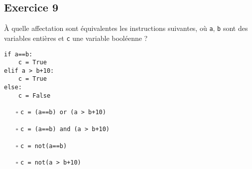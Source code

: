 \documentclass[11pt,a4paper]{article}
\providecommand{\tightlist}{\setlength{\itemsep}{0pt}\setlength{\parskip}{0pt}}
\begin{document}
 

\hypertarget{octicons-pencil-16-exercice-9}{%
\subsection*{\faPencil* Exercice
9}\label{octicons-pencil-16-exercice-9}}

À quelle affectation sont équivalentes les instructions suivantes, où
\texttt{a}, \texttt{b} sont des variables entières et \texttt{c} une
variable booléenne ?

\begin{center}
\begin{minipage}{3cm}
\begin{lstlisting}
if a==b:
    c = True
elif a > b+10:
    c = True
else:
    c = False
\end{lstlisting}
\end{minipage}
\end{center}

\begin{itemize}
\tightlist
\item[$\square$]
  \lstinline!c = (a==b) or (a > b+10)!
\item[$\square$]
  \lstinline!c = (a==b) and (a > b+10)!
\item[$\square$]
  \lstinline!c = not(a==b)!
\item[$\square$]
  \lstinline!c = not(a > b+10)!
\end{itemize}
\end{document}
